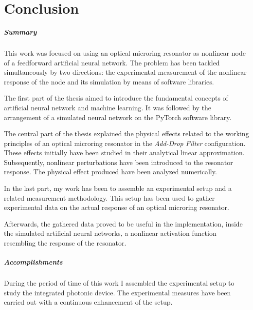 \chapter*{Conclusion}

\paragraph{Summary\\}
This work was focused on using an optical microring resonator as nonlinear node of a feedforward artificial neural network.
The problem has been tackled simultaneously by two directions: the experimental measurement of the nonlinear response of the node and its simulation by means of software libraries.

The first part of the thesis aimed to introduce the fundamental concepts of artificial neural network and machine learning.
It was followed by the arrangement of a simulated neural network on the PyTorch software library.

The central part of the thesis explained the physical effects related to the working principles of an optical microring resonator in the \textit{Add-Drop Filter} configuration.
These effects initially have been studied in their analytical linear approximation.
Subsequently, nonlinear perturbations have been introduced to the resonator response.
The physical effect produced have been analyzed numerically.

In the last part, my work has been to assemble an experimental setup and a related measurement methodology.
This setup has been used to gather experimental data on the actual response of an optical microring resonator.

Afterwards, the gathered data proved to be useful in the implementation, inside the simulated artificial neural networks, a nonlinear activation function resembling the response of the resonator.

\paragraph{Accomplishments\\}
During the period of time of this work I assembled the experimental setup to study the integrated photonic device.
The experimental measures have been carried out with a continuous enhancement of the setup.

